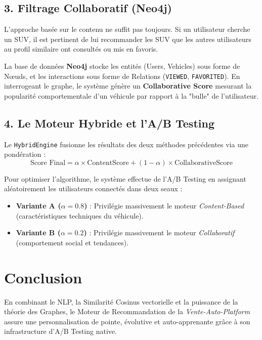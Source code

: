 \documentclass[a4paper, 11pt]{article}
\begin{document}
\vspace{0.2cm}

\subsection*{3. Filtrage Collaboratif (Neo4j)}
L'approche basée sur le contenu ne suffit pas toujours. Si un utilisateur cherche un SUV, il est pertinent de lui recommander les SUV que les autres utilisateurs au profil similaire ont consultés ou mis en favoris.

La base de données \textbf{Neo4j} stocke les entités (Users, Vehicles) sous forme de Nœuds, et les interactions sous forme de Relations (\texttt{VIEWED}, \texttt{FAVORITED}).
En interrogeant le graphe, le système génère un \textbf{Collaborative Score} mesurant la popularité comportementale d'un véhicule par rapport à la "bulle" de l'utilisateur.

\vspace{0.2cm}

\subsection*{4. Le Moteur Hybride et l'A/B Testing}
Le \texttt{HybridEngine} fusionne les résultats des deux méthodes précédentes via une pondération :
\begin{equation}
    \text{Score Final} = \alpha \times \text{ContentScore} + (1 - \alpha) \times \text{CollaborativeScore}
\end{equation}

Pour optimiser l'algorithme, le système effectue de l'A/B Testing en assignant aléatoirement les utilisateurs connectés dans deux seaux :
\begin{itemize}[label=\textbullet]
    \item \textbf{Variante A ($\alpha = 0.8$)} : Privilégie massivement le moteur \textit{Content-Based} (caractéristiques techniques du véhicule).
    \item \textbf{Variante B ($\alpha = 0.2$)} : Privilégie massivement le moteur \textit{Collaboratif} (comportement social et tendances).
\end{itemize}

\vspace{0.3cm}

\section*{Conclusion}
En combinant le NLP, la Similarité Cosinus vectorielle et la puissance de la théorie des Graphes, le Moteur de Recommandation de la \textit{Vente-Auto-Platform} assure une personnalisation de pointe, évolutive et auto-apprenante grâce à son infrastructure d'A/B Testing native.
\end{document}
